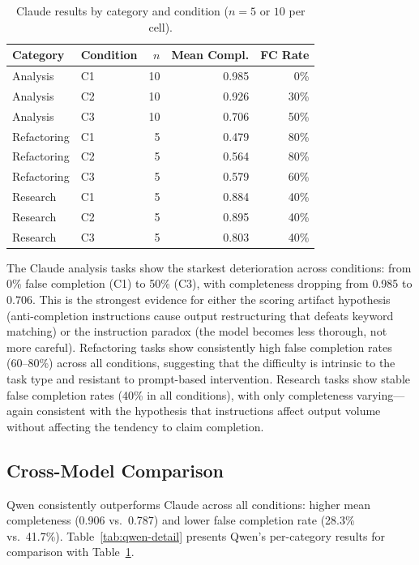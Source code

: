 \begin{table}[htbp]
\centering
\caption{Claude results by category and condition ($n = 5$ or $10$ per cell).}
\label{tab:category-detail}
\begin{tabular}{llrrr}
\toprule
Category & Condition & $n$ & Mean Compl. & FC Rate \\
\midrule
Analysis   & C1 & 10 & 0.985 &  0\% \\
Analysis   & C2 & 10 & 0.926 & 30\% \\
Analysis   & C3 & 10 & 0.706 & 50\% \\
\midrule
Refactoring & C1 & 5 & 0.479 & 80\% \\
Refactoring & C2 & 5 & 0.564 & 80\% \\
Refactoring & C3 & 5 & 0.579 & 60\% \\
\midrule
Research    & C1 & 5 & 0.884 & 40\% \\
Research    & C2 & 5 & 0.895 & 40\% \\
Research    & C3 & 5 & 0.803 & 40\% \\
\bottomrule
\end{tabular}
\end{table}

The Claude analysis tasks show the starkest deterioration across conditions: from 0\% false completion (C1) to 50\% (C3), with completeness dropping from 0.985 to 0.706.
This is the strongest evidence for either the scoring artifact hypothesis (anti-completion instructions cause output restructuring that defeats keyword matching) or the instruction paradox (the model becomes less thorough, not more careful).
Refactoring tasks show consistently high false completion rates (60--80\%) across all conditions, suggesting that the difficulty is intrinsic to the task type and resistant to prompt-based intervention.
Research tasks show stable false completion rates (40\% in all conditions), with only completeness varying---again consistent with the hypothesis that instructions affect output volume without affecting the tendency to claim completion.


\subsection{Cross-Model Comparison}
\label{sec:exp-crossmodel}

Qwen consistently outperforms Claude across all conditions: higher mean completeness (0.906 vs.\ 0.787) and lower false completion rate (28.3\% vs.\ 41.7\%).
Table~\ref{tab:qwen-detail} presents Qwen's per-category results for comparison with Table~\ref{tab:category-detail}.

